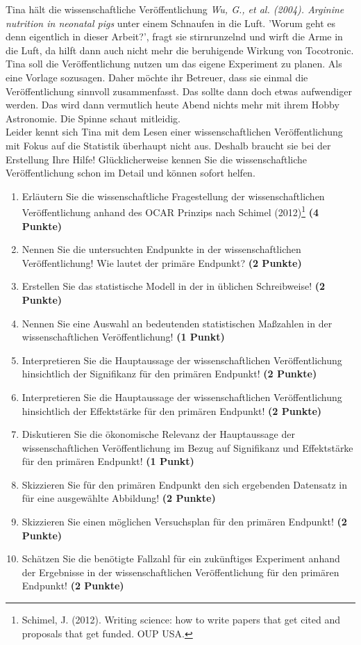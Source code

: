 \documentclass[a4paper, 9pt]{scrartcl}\usepackage[]{graphicx}\usepackage[]{xcolor}
\begin{document}
Tina hält die wissenschaftliche Veröffentlichung \textit{Wu, G., et al. (2004). Arginine nutrition in neonatal pigs} unter einem Schnaufen in die Luft. 'Worum geht es denn eigentlich in dieser Arbeit?', fragt sie stirnrunzelnd und wirft die Arme in die Luft, da hilft dann auch nicht mehr die beruhigende Wirkung von Tocotronic. Tina soll die Veröffentlichung nutzen um das eigene Experiment zu planen. Als eine Vorlage sozusagen. Daher möchte ihr Betreuer, dass sie einmal die Veröffentlichung sinnvoll zusammenfasst. Das sollte dann doch etwas aufwendiger werden. Das wird dann vermutlich heute Abend nichts mehr mit ihrem Hobby Astronomie. Die Spinne schaut mitleidig.\\

Leider kennt sich Tina mit dem Lesen einer wissenschaftlichen Veröffentlichung mit Fokus auf die Statistik überhaupt nicht aus. Deshalb braucht sie bei der Erstellung Ihre Hilfe! Glücklicherweise kennen Sie die wissenschaftliche Veröffentlichung schon im Detail und können sofort helfen.

\begin{enumerate}
  \setcounter{enumi}{0}
  \item Erläutern Sie die wissenschaftliche Fragestellung der wissenschaftlichen Veröffentlichung anhand des OCAR Prinzips nach Schimel (2012)\footnote{Schimel, J. (2012). Writing science: how to write papers that get cited and proposals that get funded. OUP USA.} \textbf{(4 Punkte)}
  \item Nennen Sie die untersuchten Endpunkte in der wissenschaftlichen Veröffentlichung! Wie lautet der primäre Endpunkt? \textbf{(2 Punkte)} 
\item Erstellen Sie das statistische Modell in der in \Rlogo üblichen Schreibweise! \textbf{(2 Punkte)}
  \item Nennen Sie eine Auswahl an bedeutenden statistischen Maßzahlen in der wissenschaftlichen Veröffentlichung! \textbf{(1 Punkt)}
  \item Interpretieren Sie die Hauptaussage der wissenschaftlichen Veröffentlichung hinsichtlich der Signifikanz für den primären Endpunkt! \textbf{(2 Punkte)}
  \item Interpretieren Sie die Hauptaussage der wissenschaftlichen Veröffentlichung hinsichtlich der Effektstärke für den primären Endpunkt! \textbf{(2 Punkte)}
  \item Diskutieren Sie die ökonomische Relevanz der Hauptaussage der wissenschaftlichen Veröffentlichung im Bezug auf Signifikanz und Effektstärke für den primären Endpunkt! \textbf{(1 Punkt)}
  \item Skizzieren Sie für den primären Endpunkt den sich ergebenden Datensatz in \Rlogo für eine ausgewählte Abbildung! \textbf{(2 Punkte)}
\item Skizzieren Sie einen möglichen Versuchsplan für den primären Endpunkt! \textbf{(2 Punkte)}
  \item Schätzen Sie die benötigte Fallzahl für ein zukünftiges Experiment anhand der Ergebnisse in der wissenschaftlichen Veröffentlichung für den primären Endpunkt! \textbf{(2 Punkte)}
\end{enumerate} 
\clearpage
\end{document}
